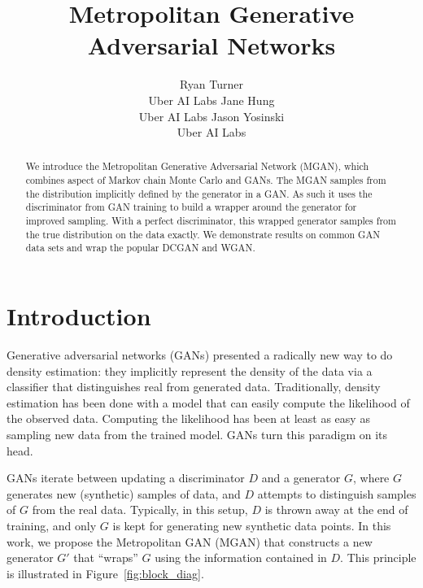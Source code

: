 \documentclass{article}
\title{Metropolitan Generative Adversarial Networks}
\author{
  Ryan Turner \\
  Uber AI Labs
  \And
  Jane Hung \\
  Uber AI Labs
  \And
  Jason Yosinski \\
  Uber AI Labs
}
\begin{document}

\maketitle

\begin{abstract}
We introduce the Metropolitan Generative Adversarial Network (MGAN), which combines aspect of Markov chain Monte Carlo and GANs.
The MGAN samples from the distribution implicitly defined by the generator in a GAN\@.
As such it uses the discriminator from GAN training to build a wrapper around the generator for improved sampling.
With a perfect discriminator, this wrapped generator samples from the true distribution on the data exactly.
We demonstrate results on common GAN data sets and wrap the popular DCGAN and WGAN\@.
\end{abstract}

\section{Introduction}

Generative adversarial networks (GANs) presented a radically new way to do density estimation:
they implicitly represent the density of the data via a classifier that distinguishes real from generated data.
Traditionally, density estimation has been done with a model that can easily compute the likelihood of the observed data.
Computing the likelihood has been at least as easy as sampling new data from the trained model.  %
GANs turn this paradigm on its head.

GANs iterate between updating a discriminator $D$ and a generator $G$, where $G$ generates new (synthetic) samples of data, and $D$ attempts to distinguish samples of $G$ from the real data.
Typically, in this setup, $D$ is thrown away at the end of training, and only $G$ is kept for generating new synthetic data points.
In this work, we propose the Metropolitan GAN (MGAN) that constructs a new generator $G'$ that ``wraps'' $G$ using the information contained in $D$.
This principle is illustrated in Figure~\ref{fig:block_diag}.
\end{document}
